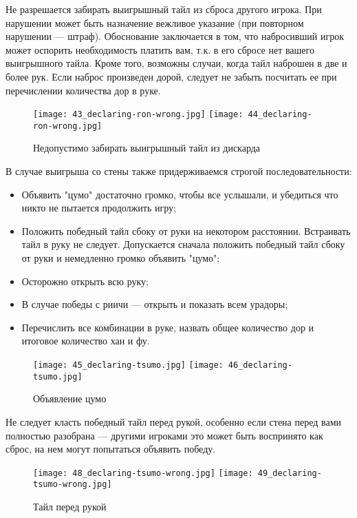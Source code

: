 Не разрешается забирать выигрышный тайл из сброса другого игрока. При нарушении может быть назначение вежливое указание (при повторном нарушении --- штраф). Обоснование заключается в том, что набросивший игрок может оспорить необходимость платить вам, т.к. в его сбросе нет вашего выигрышного тайла. Кроме того, возможны случаи, когда тайл наброшен в две и более рук. Если наброс произведен дорой, следует не забыть посчитать ее при перечислении количества дор в руке.

\begin{figure}[H]
	\centering
	\texttt{[image: 43\_declaring-ron-wrong.jpg]}
	\texttt{[image: 44\_declaring-ron-wrong.jpg]}
	\caption{Недопустимо забирать выигрышный тайл из дискарда}
\end{figure}

В случае выигрыша со стены также придерживаемся строгой последовательности:

\begin{itemize}
	\item Объявить "цумо" достаточно громко, чтобы все услышали, и убедиться что никто не пытается продолжить игру;
	\item Положить победный тайл сбоку от руки на некотором расстоянии. Встраивать тайл в руку не следует. Допускается сначала положить победный тайл сбоку от руки и немедленно громко объявить "цумо";
	\item Осторожно открыть всю руку;
	\item В случае победы с риичи --- открыть и показать всем урадоры;
	\item Перечислить все комбинации в руке, назвать общее количество дор и итоговое количество хан и фу.
\end{itemize}

\begin{figure}[H]
	\centering
	\texttt{[image: 45\_declaring-tsumo.jpg]}
	\texttt{[image: 46\_declaring-tsumo.jpg]}
	\caption{Объявление цумо}
\end{figure}

Не следует класть победный тайл перед рукой, особенно если стена перед вами полностью разобрана --- другими игроками это может быть воспринято как сброс, на нем могут попытаться объявить победу.

\begin{figure}[H]
	\centering
	\texttt{[image: 48\_declaring-tsumo-wrong.jpg]}
	\texttt{[image: 49\_declaring-tsumo-wrong.jpg]}
	\caption{Тайл перед рукой}
\end{figure}

